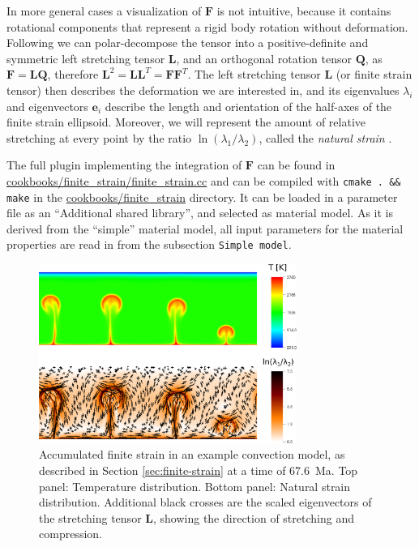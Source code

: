 \documentclass{article}
\begin{document}
In more general cases a visualization of $\mathbf F$ is not intuitive, because it contains rotational components that represent a rigid body rotation without deformation. Following \cite{Becker2003} we can polar-decompose the tensor into a positive-definite and symmetric left stretching tensor $\mathbf L$, and an orthogonal rotation tensor $\mathbf Q$, as $\mathbf F = \mathbf L \mathbf Q$, therefore $\mathbf L^2 = \mathbf L \mathbf L^T = \mathbf F \mathbf F^T$. The left stretching tensor $\mathbf L$ (or finite strain tensor) then describes the deformation we are interested in, and its eigenvalues $\lambda_i$ and eigenvectors $\mathbf e_i$ describe the length and orientation of the half-axes of the finite strain ellipsoid. Moreover, we will represent the amount of relative stretching at every point by the ratio $\ln(\lambda_1/\lambda_2)$, called the \textit{natural strain} \cite{Ribe1992}.

The full plugin implementing the integration of $\mathbf F$ can be found in \url{cookbooks/finite_strain/finite_strain.cc} and can be compiled 
with \texttt{cmake . \&\& make} in the \url{cookbooks/finite_strain} directory. 
It can be loaded in a parameter file as an ``Additional shared library'', and selected as material
model. As it is derived from the ``simple'' material model, all input parameters for the material
properties are read in from the subsection \texttt{Simple model}. 


\begin{figure}
    \centering
    \includegraphics[width=0.75\textwidth]{cookbooks/finite_strain/finite_strain.pdf}
    \caption{Accumulated finite strain in an example convection model, as described in Section 
             \ref{sec:finite-strain} at a time of 67.6~Ma. Top panel: Temperature distribution. Bottom panel:
             Natural strain distribution. Additional black crosses are the scaled eigenvectors of the
             stretching tensor $\mathbf L$, showing the direction of stretching and compression.}
    \label{fig:finite_strain}
\end{figure}
\end{document}
